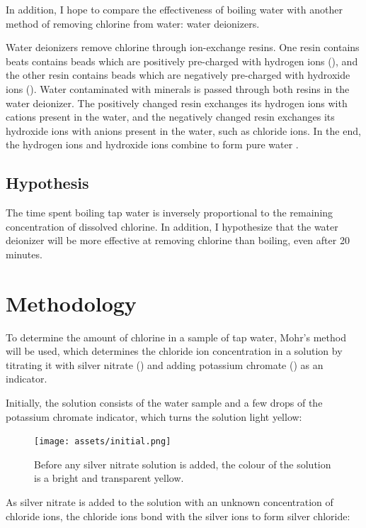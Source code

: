 \documentclass[11pt]{article}
\begin{document}
In addition, I hope to compare the effectiveness of boiling water with another method of removing chlorine from water: water deionizers.

Water deionizers remove chlorine through ion-exchange resins. One resin contains beats contains beads which are positively pre-charged with hydrogen ions (), and the other resin contains beads which are negatively pre-charged with hydroxide ions (). Water contaminated with minerals is passed through both resins in the water deionizer. The positively changed resin exchanges its hydrogen ions with cations present in the water, and the negatively changed resin exchanges its hydroxide ions with anions present in the water, such as chloride ions. In the end, the hydrogen ions and hydroxide ions combine to form pure water .


\subsection{Hypothesis}
The time spent boiling tap water is inversely proportional to the remaining concentration of dissolved chlorine. In addition, I hypothesize that the water deionizer will be more effective at removing chlorine than boiling, even after 20 minutes.

\newpage

\section{Methodology}

To determine the amount of chlorine in a sample of tap water, Mohr's method will be used, which determines the chloride ion concentration in a solution by titrating it with silver nitrate () and adding potassium chromate () as an indicator.

Initially, the solution consists of the water sample and a few drops of the potassium chromate indicator, which turns the solution light yellow:

\begin{figure}[H]
	\centering
	\texttt{[image: assets/initial.png]}
	\caption{Before any silver nitrate solution is added, the colour of the solution is a bright and transparent yellow.}
\end{figure}

As silver nitrate is added to the solution with an unknown concentration of chloride ions, the chloride ions bond with the silver ions to form silver chloride:
\end{document}
